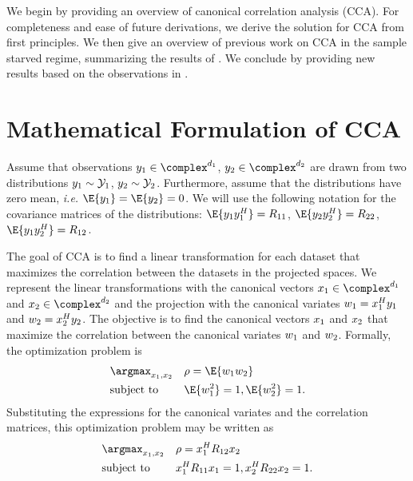 We begin by providing an overview of canonical correlation analysis (CCA). For
completeness and ease of future derivations, we derive the solution for CCA from first
principles. We then give an overview of previous work on CCA in the sample starved regime,
summarizing the results of \cite{pezeshki2004empirical,nadakuditi2011fundamental}. We
conclude by providing new results based on the observations in
\cite{nadakuditi2011fundamental}.

\section{Mathematical Formulation of CCA}\label{sec:cca_form}
Assume that observations $\yI\in\complex^{d_1}$, $\yII\in\complex^{d_2}$
are drawn from two distributions $y_1\sim\mathcal{Y}_1$,
$y_2\sim\mathcal{Y}_2$. Furthermore, assume that the distributions have zero mean,
\textit{i.e.} $\E{\yI}=\E{\yII}=0$. We will use the following notation for the covariance
matrices of the distributions: $\E{\yI\yI^H}=\RI$, $\E{\yII\yII^H}=\RII$,
$\E{\yI\yII^H}=\RIII$.

The goal of CCA is to find a linear transformation for each dataset that maximizes the
correlation between the datasets in the projected spaces. We represent the linear
transformations with the canonical vectors $\xI\in\complex^{d_1}$ and
$\xII\in\complex^{d_2}$ and the projection with the canonical variates $w_1=x_1^Hy_1$ and
$w_2=x_2^Hy_2$. The objective is to find the canonical vectors $x_1$ and $x_2$ that
maximize the correlation between the canonical variates $w_1$ and $w_2$. Formally, the
optimization problem is
\begin{equation}\label{eq:cca_opt}
  \begin{aligned}
    &\argmax_{\xI,\xII}&&\rho = \E{\wI\wII}\\
    & \text{subject to}&&\E{\wI^2}=1, \E{\wII^2}=1.
  \end{aligned}
\end{equation}
Substituting the expressions for the canonical variates and the correlation matrices, this
optimization problem may be written as
\begin{equation}\label{eq:cca_opt2}
  \begin{aligned}
    &\argmax_{\xI,\xII}&&\rho = \xI^H\RIII\xII\\
    & \text{subject to}&&\xI^H\RI\xI=1, \xII^H\RII\xII=1.
  \end{aligned}
\end{equation}

